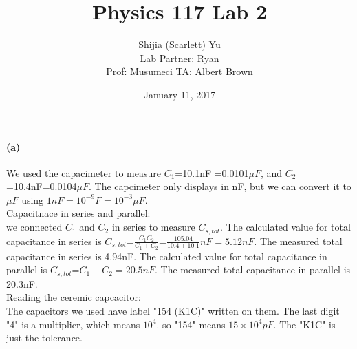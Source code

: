 \documentclass[]{article}
\title{Physics 117 Lab 2}
\author{Shijia (Scarlett) Yu \\Lab Partner: Ryan\\Prof: Musumeci TA: Albert Brown}
\date{January 11, 2017}
\begin{document}
	\maketitle
	\paragraph { (a)} %
	We used the capacimeter to measure $C_{1}$=10.1nF =0.0101$\mu F$, and $C_{2}$ =10.4nF=0.0104$\mu F$. The capcimeter only displays in nF, but we can convert it to $\mu F$ using $1nF=10^{-9}F=10^{-3}\mu F$. \\Capacitnace in series and parallel:\\ we  connected $C_{1}$ and $C_{2}$ in series to measure $C_{s,tot}$. The calculated value for total capacitance in series is $C_{s, tot}$=$ \frac{C_{1}C_{2}}{C_{1}+C_{2}}$=$ \frac{105.04}{10.4+10.1}nF=5.12nF$. The measured total capacitance in series is 4.94nF. The calculated value for total capacitance in parallel is $C_{s, tot}$=$ C_{1}+C_{2}=20.5nF$. The measured total capacitance in parallel is 20.3nF. \\
	Reading the ceremic capcacitor: \\
	The capacitors we used have label "154 (K1C)" written on them. The last digit "4" is a multiplier, which means $10^{4}$. so "154" means $15\times10^{4}pF$. The "K1C" is just the tolerance.
\end{document}
